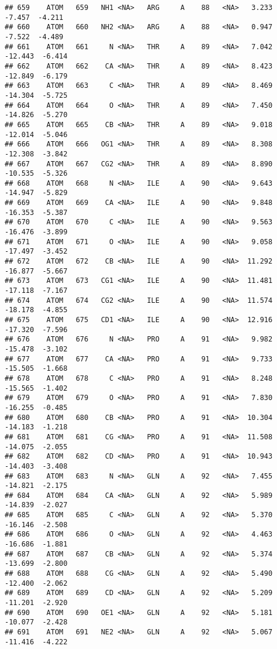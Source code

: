 \documentclass[
]{article}
\begin{document}
\begin{verbatim}
## 659    ATOM   659   NH1 <NA>   ARG     A    88   <NA>   3.233  -7.457  -4.211
## 660    ATOM   660   NH2 <NA>   ARG     A    88   <NA>   0.947  -7.522  -4.489
## 661    ATOM   661     N <NA>   THR     A    89   <NA>   7.042 -12.443  -6.414
## 662    ATOM   662    CA <NA>   THR     A    89   <NA>   8.423 -12.849  -6.179
## 663    ATOM   663     C <NA>   THR     A    89   <NA>   8.469 -14.304  -5.725
## 664    ATOM   664     O <NA>   THR     A    89   <NA>   7.450 -14.826  -5.270
## 665    ATOM   665    CB <NA>   THR     A    89   <NA>   9.018 -12.014  -5.046
## 666    ATOM   666   OG1 <NA>   THR     A    89   <NA>   8.308 -12.308  -3.842
## 667    ATOM   667   CG2 <NA>   THR     A    89   <NA>   8.890 -10.535  -5.326
## 668    ATOM   668     N <NA>   ILE     A    90   <NA>   9.643 -14.947  -5.829
## 669    ATOM   669    CA <NA>   ILE     A    90   <NA>   9.848 -16.353  -5.387
## 670    ATOM   670     C <NA>   ILE     A    90   <NA>   9.563 -16.476  -3.899
## 671    ATOM   671     O <NA>   ILE     A    90   <NA>   9.058 -17.497  -3.452
## 672    ATOM   672    CB <NA>   ILE     A    90   <NA>  11.292 -16.877  -5.667
## 673    ATOM   673   CG1 <NA>   ILE     A    90   <NA>  11.481 -17.118  -7.167
## 674    ATOM   674   CG2 <NA>   ILE     A    90   <NA>  11.574 -18.178  -4.855
## 675    ATOM   675   CD1 <NA>   ILE     A    90   <NA>  12.916 -17.320  -7.596
## 676    ATOM   676     N <NA>   PRO     A    91   <NA>   9.982 -15.478  -3.102
## 677    ATOM   677    CA <NA>   PRO     A    91   <NA>   9.733 -15.505  -1.668
## 678    ATOM   678     C <NA>   PRO     A    91   <NA>   8.248 -15.565  -1.402
## 679    ATOM   679     O <NA>   PRO     A    91   <NA>   7.830 -16.255  -0.485
## 680    ATOM   680    CB <NA>   PRO     A    91   <NA>  10.304 -14.183  -1.218
## 681    ATOM   681    CG <NA>   PRO     A    91   <NA>  11.508 -14.075  -2.055
## 682    ATOM   682    CD <NA>   PRO     A    91   <NA>  10.943 -14.403  -3.408
## 683    ATOM   683     N <NA>   GLN     A    92   <NA>   7.455 -14.821  -2.175
## 684    ATOM   684    CA <NA>   GLN     A    92   <NA>   5.989 -14.839  -2.027
## 685    ATOM   685     C <NA>   GLN     A    92   <NA>   5.370 -16.146  -2.508
## 686    ATOM   686     O <NA>   GLN     A    92   <NA>   4.463 -16.686  -1.881
## 687    ATOM   687    CB <NA>   GLN     A    92   <NA>   5.374 -13.699  -2.800
## 688    ATOM   688    CG <NA>   GLN     A    92   <NA>   5.490 -12.400  -2.062
## 689    ATOM   689    CD <NA>   GLN     A    92   <NA>   5.209 -11.201  -2.920
## 690    ATOM   690   OE1 <NA>   GLN     A    92   <NA>   5.181 -10.077  -2.428
## 691    ATOM   691   NE2 <NA>   GLN     A    92   <NA>   5.067 -11.416  -4.222

\end{verbatim}
\end{document}
